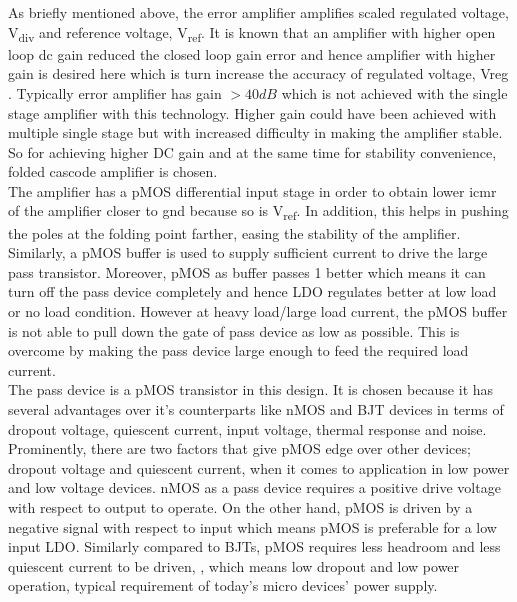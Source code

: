 \documentclass[12pt,a4paper,UKenglish]{article}
\begin{document}
As briefly mentioned above, the error amplifier amplifies scaled regulated voltage, V\textsubscript{div} and reference voltage, V\textsubscript{ref}. It is known that an amplifier with higher open loop \acrshort{dc} gain reduced the closed loop gain error and hence amplifier with higher gain is desired here which is turn increase the accuracy of regulated voltage, Vreg \cite{ldo_bulkmod}. Typically error amplifier has gain $> 40 dB$ which is not achieved with the single stage amplifier with this technology. Higher gain could have been achieved with multiple single stage but with increased difficulty in making the amplifier stable. So for achieving higher DC gain and at the same time for stability convenience, folded cascode amplifier \cite[pp. xx]{razavi_2001} is chosen. \\

The amplifier has a pMOS differential input stage in order to obtain lower \acrshort{icmr} of the amplifier closer to gnd because so is V\textsubscript{ref}. In addition, this helps in pushing the poles at the folding point farther, easing the stability of the amplifier\cite[pp. 304-305]{razavi_2001}. Similarly, a pMOS buffer is used to supply sufficient current to drive the large pass transistor.  Moreover, pMOS as buffer passes 1 better which means it can turn off the pass device completely and hence LDO regulates better at low load or no load condition. However at heavy load/large load current, the pMOS buffer is not able to pull down the gate of pass device as low as possible.  This is overcome by making the pass device large enough to feed the required load current.\\

The pass device is a pMOS transistor in this design. It is chosen because it has several advantages over it's counterparts like nMOS and BJT devices in terms of dropout voltage, quiescent current, input voltage, thermal response and noise\cite{ldo_ti_pmos}. Prominently, there are two factors that give pMOS edge over other devices; dropout voltage and quiescent current, when it comes to application in low power and low voltage devices. nMOS as a pass device requires a positive drive voltage with respect to output to operate. On the other hand, pMOS is driven by a negative signal with respect to input which means pMOS is preferable for a low input LDO. Similarly compared to BJTs, pMOS requires less headroom and less quiescent current to be driven\cite{ldo_ti_pmos}, \cite{ldo_ti_stability}, which means low dropout and low power operation, typical requirement of today's micro devices' power supply. \\
\end{document}
